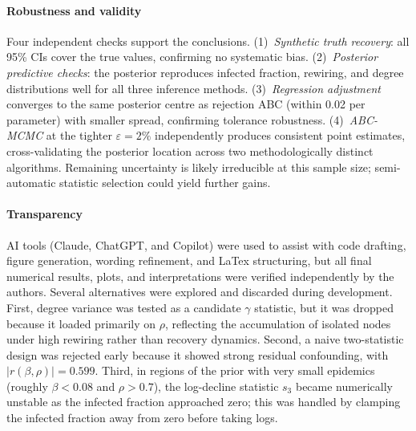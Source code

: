 \documentclass[12pt]{article}
\begin{document}
\paragraph{Robustness and validity}
Four independent checks support the conclusions. (1)~\emph{Synthetic truth recovery}: all 95\% CIs cover the true values, confirming no systematic bias. (2)~\emph{Posterior predictive checks}: the posterior reproduces infected fraction, rewiring, and degree distributions well for all three inference methods. (3)~\emph{Regression adjustment} converges to the same posterior centre as rejection ABC (within 0.02 per parameter) with smaller spread, confirming tolerance robustness. (4)~\emph{ABC-MCMC} at the tighter $\varepsilon=2\%$ independently produces consistent point estimates, cross-validating the posterior location across two methodologically distinct algorithms. Remaining uncertainty is likely irreducible at this sample size; semi-automatic statistic selection \cite{FP12} could yield further gains.

\paragraph{Transparency}
AI tools (Claude, ChatGPT, and Copilot) were used to assist with code drafting, figure generation, wording refinement, and LaTex structuring, but all final numerical results, plots, and interpretations were verified independently by the authors. Several alternatives were explored and discarded during development. First, degree variance was tested as a candidate $\gamma$ statistic, but it was dropped because it loaded primarily on $\rho$, reflecting the accumulation of isolated nodes under high rewiring rather than recovery dynamics. Second, a naive two-statistic design was rejected early because it showed strong residual confounding, with $|r(\beta,\rho)| = 0.599$. Third, in regions of the prior with very small epidemics (roughly $\beta < 0.08$ and $\rho > 0.7$), the log-decline statistic $s_3$ became numerically unstable as the infected fraction approached zero; this was handled by clamping the infected fraction away from zero before taking logs.



\end{document}
